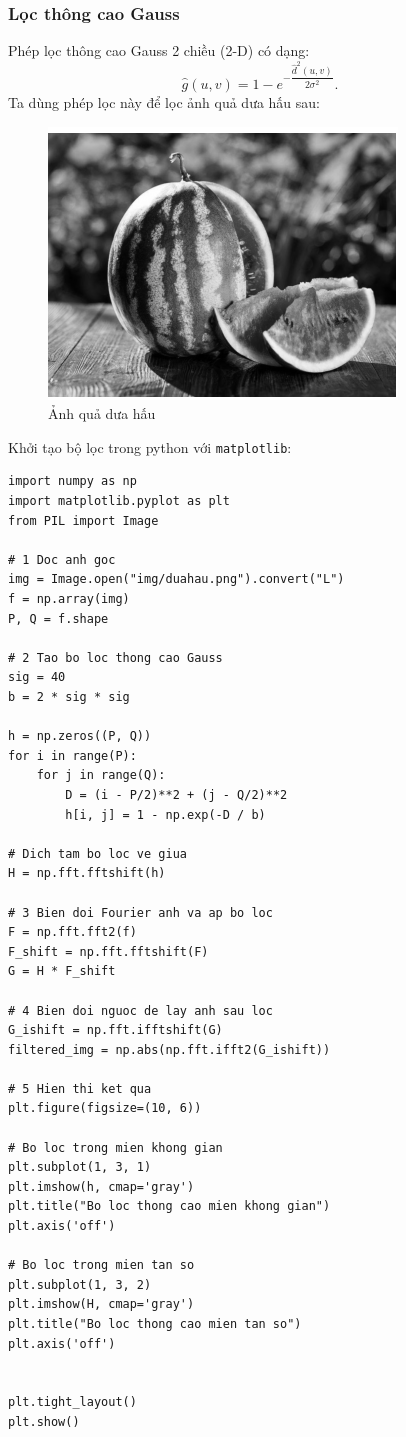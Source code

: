 \documentclass[12pt,a4paper]{report}
\numberwithin{equation}{section}
\theoremstyle{definition} %
\begin{document}
\subsubsection{Lọc thông cao Gauss}
Phép lọc thông cao Gauss 2 chiều (2-D) có dạng: 
\begin{equation}
    \hat{g}(u,v) = 1- e^{-\dfrac{\hat{d}^2(u,v)}{2\sigma^2}}.    
\end{equation}
Ta dùng phép lọc này để lọc ảnh quả dưa hấu sau: 
\begin{figure}[H]
\centering
\includegraphics[width=0.5\linewidth]{img/Duahau.png}
\caption{Ảnh quả dưa hấu}
\end{figure}
Khởi tạo bộ lọc trong python với \texttt{matplotlib}: 
\begin{lstlisting}
import numpy as np
import matplotlib.pyplot as plt
from PIL import Image

# 1 Doc anh goc
img = Image.open("img/duahau.png").convert("L")
f = np.array(img)
P, Q = f.shape

# 2 Tao bo loc thong cao Gauss
sig = 40
b = 2 * sig * sig

h = np.zeros((P, Q))
for i in range(P):
    for j in range(Q):
        D = (i - P/2)**2 + (j - Q/2)**2
        h[i, j] = 1 - np.exp(-D / b)

# Dich tam bo loc ve giua
H = np.fft.fftshift(h)

# 3 Bien doi Fourier anh va ap bo loc
F = np.fft.fft2(f)
F_shift = np.fft.fftshift(F)
G = H * F_shift

# 4 Bien doi nguoc de lay anh sau loc
G_ishift = np.fft.ifftshift(G)
filtered_img = np.abs(np.fft.ifft2(G_ishift))

# 5 Hien thi ket qua
plt.figure(figsize=(10, 6))

# Bo loc trong mien khong gian
plt.subplot(1, 3, 1)
plt.imshow(h, cmap='gray')
plt.title("Bo loc thong cao mien khong gian")
plt.axis('off')

# Bo loc trong mien tan so
plt.subplot(1, 3, 2)
plt.imshow(H, cmap='gray')
plt.title("Bo loc thong cao mien tan so")
plt.axis('off')


plt.tight_layout()
plt.show()
\end{lstlisting}
\end{document}
